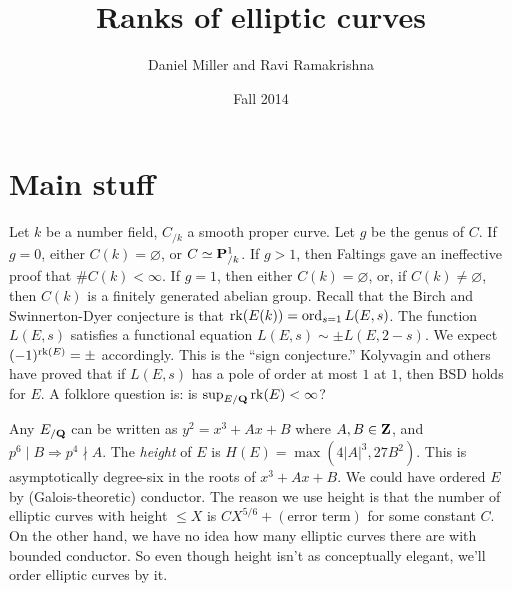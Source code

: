 \documentclass[oneside]{article}
\title{Ranks of elliptic curves}
\author{Daniel Miller and Ravi Ramakrishna}
\date{Fall 2014}
\begin{document}
\maketitle
\tableofcontents








\section{Main stuff}

Let $k$ be a number field, $C_{/k}$ a smooth proper curve. Let $g$ be the 
genus of $C$. If $g=0$, either $C(k)=\varnothing$, or $C\simeq \mathbf{P}^1_{/k}$. 
If $g>1$, then Faltings gave an ineffective proof that $\# C(k)<\infty$. 
If $g=1$, then either $C(k)=\varnothing$, or, if $C(k)\ne\varnothing$, then 
$C(k)$ is a finitely generated abelian group. Recall that the Birch and 
Swinnerton-Dyer conjecture is that $\operatorname{rk}(E(k))=\operatorname{ord}_{s=1} L(E,s)$. The 
function $L(E,s)$ satisfies a functional equation $L(E,s) \sim \pm L(E,2-s)$. 
We expect $(-1)^{\operatorname{rk}(E)}=\pm$ accordingly. This is the ``sign conjecture.'' 
Kolyvagin and others have proved that if $L(E,s)$ has a pole of order at most 
$1$ at $1$, then BSD holds for $E$. A folklore question is: is 
$\sup_{E/\mathbf{Q}} \operatorname{rk}(E)<\infty$?

Any $E_{/\mathbf{Q}}$ can be written as $y^2=x^3+A x+B$ where $A,B\in \mathbf{Z}$, and 
$p^6\mid B\Rightarrow p^4\nmid A$. The \emph{height} of $E$ is 
$H(E)=\max(4|A|^3,27 B^2)$. This is asymptotically degree-six in the roots 
of $x^3+A x+B$. We could have ordered $E$ by (Galois-theoretic) conductor. The 
reason we use height is that the number of elliptic curves with height 
$\leqslant X$ is $C X^{5/6}+(\text{error term})$ for some constant $C$. On the 
other hand, we have no idea how many elliptic curves there are with bounded 
conductor. So even though height isn't as conceptually elegant, we'll order 
elliptic curves by it. 
\end{document}
